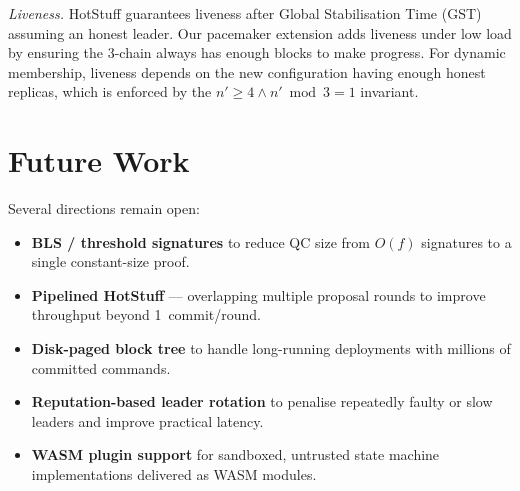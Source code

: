 \textit{Liveness.}  HotStuff guarantees liveness after Global Stabilisation Time (GST)
assuming an honest leader.  Our pacemaker extension adds liveness under low load by ensuring
the 3-chain always has enough blocks to make progress.  For dynamic membership, liveness
depends on the new configuration having enough honest replicas, which is enforced by the
$n' \ge 4 \wedge n' \bmod 3 = 1$ invariant.

\section{Future Work}

Several directions remain open:

\begin{itemize}
  \item \textbf{BLS / threshold signatures} to reduce QC size from $O(f)$ signatures to a
    single constant-size proof.
  \item \textbf{Pipelined HotStuff} --- overlapping multiple proposal rounds to improve
    throughput beyond 1~commit/round.
  \item \textbf{Disk-paged block tree} to handle long-running deployments with millions of
    committed commands.
  \item \textbf{Reputation-based leader rotation} to penalise repeatedly faulty or slow
    leaders and improve practical latency.
  \item \textbf{WASM plugin support} for sandboxed, untrusted state machine implementations
    delivered as WASM modules.
\end{itemize}
